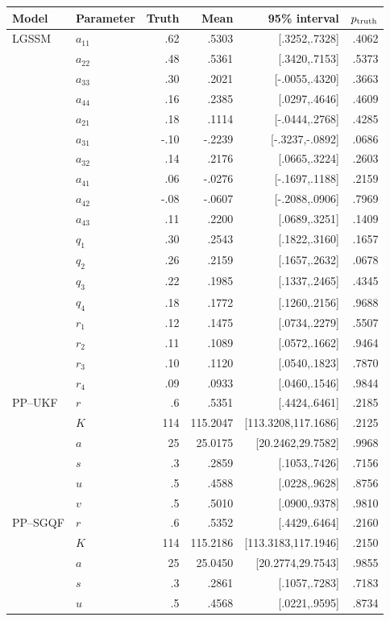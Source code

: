 \begin{table}[htbp]
\centering\scriptsize
\setlength{\tabcolsep}{2.5pt}
\begin{tabular}{llrrrr}
\toprule
Model&Parameter&Truth&Mean&95\% interval&$p_{\rm truth}$\\
\midrule
LGSSM&$a_{11}$&.62&.5303&[.3252,.7328]&.4062\\
&$a_{22}$&.48&.5361&[.3420,.7153]&.5373\\
&$a_{33}$&.30&.2021&[-.0055,.4320]&.3663\\
&$a_{44}$&.16&.2385&[.0297,.4646]&.4609\\
&$a_{21}$&.18&.1114&[-.0444,.2768]&.4285\\
&$a_{31}$&-.10&-.2239&[-.3237,-.0892]&.0686\\
&$a_{32}$&.14&.2176&[.0665,.3224]&.2603\\
&$a_{41}$&.06&-.0276&[-.1697,.1188]&.2159\\
&$a_{42}$&-.08&-.0607&[-.2088,.0906]&.7969\\
&$a_{43}$&.11&.2200&[.0689,.3251]&.1409\\
&$q_1$&.30&.2543&[.1822,.3160]&.1657\\
&$q_2$&.26&.2159&[.1657,.2632]&.0678\\
&$q_3$&.22&.1985&[.1337,.2465]&.4345\\
&$q_4$&.18&.1772&[.1260,.2156]&.9688\\
&$r_1$&.12&.1475&[.0734,.2279]&.5507\\
&$r_2$&.11&.1089&[.0572,.1662]&.9464\\
&$r_3$&.10&.1120&[.0540,.1823]&.7870\\
&$r_4$&.09&.0933&[.0460,.1546]&.9844\\
\midrule
PP--UKF&$r$&.6&.5351&[.4424,.6461]&.2185\\
&$K$&114&115.2047&[113.3208,117.1686]&.2125\\
&$a$&25&25.0175&[20.2462,29.7582]&.9968\\
&$s$&.3&.2859&[.1053,.7426]&.7156\\
&$u$&.5&.4588&[.0228,.9628]&.8756\\
&$v$&.5&.5010&[.0900,.9378]&.9810\\
\midrule
PP--SGQF&$r$&.6&.5352&[.4429,.6464]&.2160\\
&$K$&114&115.2186&[113.3183,117.1946]&.2150\\
&$a$&25&25.0450&[20.2774,29.7543]&.9855\\
&$s$&.3&.2861&[.1057,.7283]&.7183\\
&$u$&.5&.4568&[.0221,.9595]&.8734\\

\end{tabular}
\end{table}
